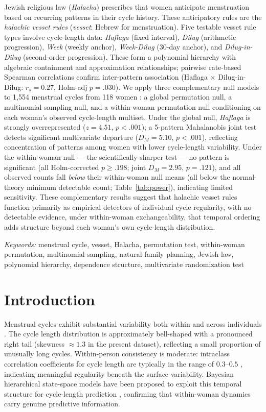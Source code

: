 \documentclass[12pt]{article}
\begin{document}
\noindent
Jewish religious law (\textit{Halacha}) prescribes that women anticipate menstruation
based on recurring patterns in their cycle history. These anticipatory rules are
the \textit{halachic vesset rules} (\textit{vesset}: Hebrew for menstruation).
Five testable vesset rule types involve cycle-length data: \textit{Haflaga} (fixed interval),
\textit{Dilug} (arithmetic progression), \textit{Week} (weekly anchor),
\textit{Week-Dilug} (30-day anchor), and \textit{Dilug-in-Dilug} (second-order
progression). These form a polynomial hierarchy with algebraic containment and
approximation relationships; pairwise rate-based Spearman correlations confirm
inter-pattern association (Haflaga $\times$ Dilug-in-Dilug: $r_s = 0.27$,
Holm-adj $p = .030$).
We apply three complementary null models to 1,554 menstrual cycles from 118 women
\cite{fehring2013}: a global permutation null, a multinomial sampling null, and a
within-woman permutation null conditioning on each woman's observed
cycle-length multiset. Under the global null, \textit{Haflaga} is strongly
overrepresented ($z = 4.51$, $p < .001$); a 5-pattern Mahalanobis joint test
detects significant multivariate departure ($D_M = 5.10$, $p < .001$),
reflecting concentration of patterns among women with lower cycle-length variability.
Under the within-woman null --- the scientifically sharper test --- no pattern
is significant (all Holm-corrected $p \geq .198$; joint $D_M = 2.95$, $p = .121$), and all observed
counts fall \emph{below} their within-woman null means (all below the normal-theory
minimum detectable count; Table~\ref{tab:power}), indicating limited sensitivity. These complementary results
suggest that halachic vesset rules function primarily as empirical detectors of
individual cycle regularity, with no detectable evidence, under within-woman exchangeability,
that temporal ordering adds structure beyond each woman's own cycle-length distribution.

\medskip
\noindent\textit{Keywords:} menstrual cycle, vesset, Halacha, permutation test,
within-woman permutation, multinomial sampling, natural family planning, Jewish law,
polynomial hierarchy, dependence structure, multivariate randomization test

\newpage
\section{Introduction}

Menstrual cycles exhibit substantial variability both within and across individuals
\cite{munster1992,creinin2004,symul2019}. The cycle length distribution is
approximately bell-shaped with a pronounced right tail (skewness $\approx 1.3$ in the
present dataset), reflecting a small proportion of unusually long cycles. Within-person
consistency is moderate: intraclass correlation coefficients for cycle length are
typically in the range of $0.3$--$0.5$ \cite{dasharathy2012}, indicating meaningful
regularity beneath the surface variability. Bayesian hierarchical state-space models have
been proposed to exploit this temporal structure for cycle-length prediction
\cite{bortot2010}, confirming that within-woman dynamics carry genuine predictive
information.
\end{document}
